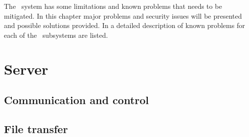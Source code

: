 The \appName\ system has some limitations and known problems that needs to be
mitigated. In this chapter major problems and security issues will be presented
and possible solutions provided. In  a detailed
description of known problems for each of the \appName\ subsystems are listed.

\section{Server}
\subsection{Communication and control}

\subsection{File transfer}

